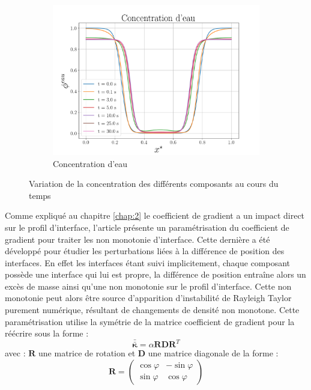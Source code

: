 \begin{figure}[H]
	\centering
	\ContinuedFloat
	\begin{subfigure}[H]{0.45\textwidth}
		\centering
		\includegraphics[width=\textwidth]{figure/nouveau_parametrage/eau_New_Parametrage.png}
		\caption{Concentration d'eau}
	\end{subfigure}
	\caption{Variation de la concentration des différents composants au cours du temps}
	\label{fig:resultstatiquegoodlandscape}
\end{figure}
Comme expliqué au chapitre \ref{chap:2} le coefficient de gradient a un impact direct sur le profil d'interface, l'article \cite{rasolofomanana_diffuse-interface_2022} présente un paramétrisation du coefficient de gradient pour traiter les non monotonie d'interface.
Cette dernière a été développé pour étudier les perturbations liées à la différence de position des interfaces. En effet les interfaces étant suivi implicitement, chaque composant possède une interface qui lui est propre, la différence de position entraîne alors un excès de masse ainsi qu'une non monotonie sur le profil d'interface. Cette non monotonie peut alors être source d'apparition  d'instabilité de Rayleigh Taylor purement numérique, résultant de changements de densité non monotone. Cette paramétrisation utilise la symétrie de la matrice coefficient de gradient pour la réécrire sous la forme :
\begin{equation}
\bar{\bar{\bm{\kappa}}} = \alpha \bm{R}\bm{D}\bm{R}^T
\label{eq:param_kappa}
\end{equation}
avec : $\bm{R}$ une matrice de rotation et $\bm{D}$ une matrice diagonale de la forme :
\begin{equation}
\bm{R} =    \begin{pmatrix} 
\cos\varphi & -\sin\varphi \\ 
\sin\varphi				&  \cos\varphi
\end{pmatrix}
\end{equation}
